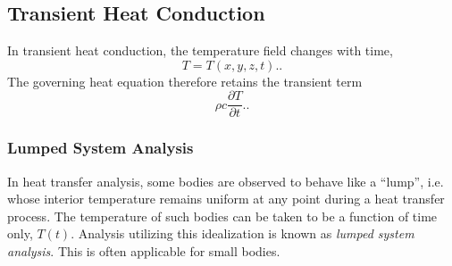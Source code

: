 

\subsection{Transient Heat Conduction}
In transient heat conduction, the temperature field changes with time,
\begin{equation*}
  T = T(x,y,z,t).
.\end{equation*}
The governing heat equation therefore retains the transient term
\begin{equation*}
  \rho c \frac{\partial T}{\partial t}.
.\end{equation*}

\subsubsection{Lumped System Analysis}
In heat transfer analysis, some bodies are observed to behave like a ``lump'', i.e. whose interior temperature remains uniform at any point during a heat transfer process.
The temperature of such bodies can be taken to be a function of time only, $T(t)$.
Analysis utilizing this idealization is known as \textit{lumped system analysis}.
This is often applicable for small bodies.


